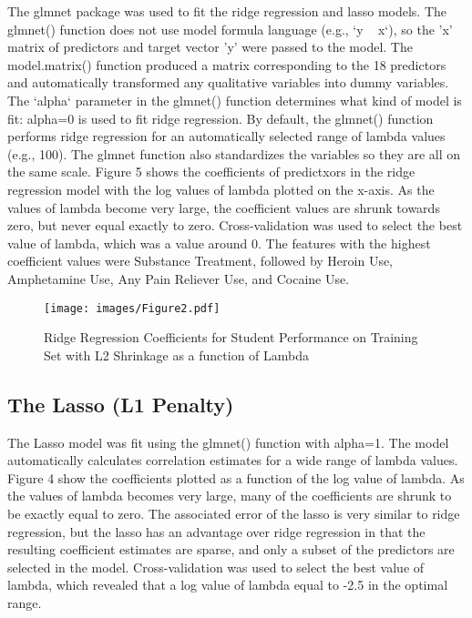 \documentclass[sigconf]{acmart}
\begin{document}
The glmnet package was used to fit the ridge regression and lasso models. 
The glmnet() function does not use model formula language (e.g., `y ~ x`), 
so the 'x' matrix of predictors and target vector 'y' were passed to the 
model. The model.matrix() function produced a matrix corresponding to the 
18 predictors and automatically transformed any qualitative variables into
dummy variables. The `alpha` parameter in the glmnet() function determines 
what kind of model is fit: alpha=0 is used to fit ridge regression. 
By default, the glmnet() function performs ridge regression for an 
automatically selected range of lambda values (e.g., 100). The glmnet 
function also standardizes the variables so they are all on the same scale.
Figure 5 shows the coefficients of predictxors in the ridge regression model 
with the log values of lambda plotted on the x-axis. As the values of lambda 
become very large, the coefficient values are shrunk towards zero, but 
never equal exactly to zero. Cross-validation was used to select the best 
value of lambda, which was a value around 0. The features with the highest 
coefficient values were Substance Treatment, followed by Heroin Use, 
Amphetamine Use, Any Pain Reliever Use, and Cocaine Use. 

\begin{figure}[!ht]
  \centering\texttt{[image: images/Figure2.pdf]}
  \caption{Ridge Regression Coefficients for Student Performance on Training Set
  with L2 Shrinkage as a function of Lambda}
  \label{f:Figure2}
\end{figure}



\subsection{The Lasso (L1 Penalty)}

The Lasso model was fit using the glmnet() function with alpha=1. The model
automatically calculates correlation estimates for a wide range of lambda
values. Figure 4 show the coefficients plotted as a function of the log
value of lambda. As the values of lambda becomes very large, many of the 
coefficients are shrunk to be exactly equal to zero. The associated error 
of the lasso is very similar to ridge regression, but the lasso has an 
advantage over ridge regression in that the resulting coefficient estimates 
are sparse, and only a subset of the predictors are selected in the model. 
Cross-validation was used to select the best value of lambda, which 
revealed that a log value of lambda equal to -2.5 in the optimal range.
\end{document}
